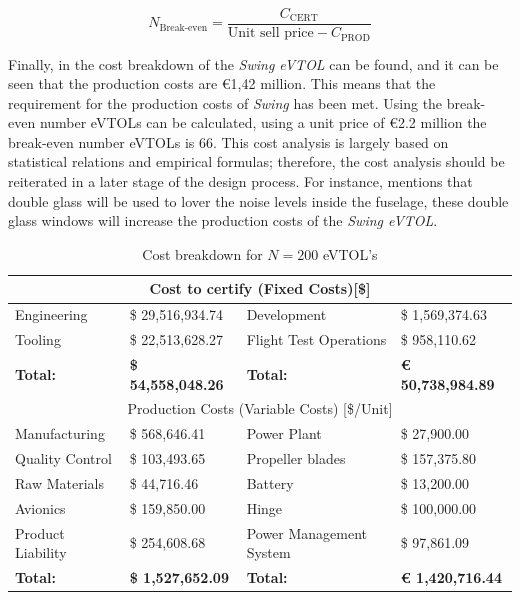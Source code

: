 \begin{equation}
    \label{eq:cost:Nbreakeven}
    N_{\text{Break-even}} = \frac{C_{\text{CERT}}}{\text{Unit sell price} - C_{\text{PROD}} }
\end{equation}

Finally, in  the cost breakdown of the \textit{Swing eVTOL} can be found, and it can be seen that the production costs are €1,42 million.
This means that the requirement for the production costs of \textit{Swing} has been met.
Using  the break-even number eVTOLs can be calculated, using a unit price of €2.2 million the break-even number eVTOLs is 66.
This cost analysis is largely based on statistical relations and empirical formulas; therefore, the cost analysis should be reiterated in a later stage of the design process.
For instance,  mentions that double glass will be used to lover the noise levels inside the fuselage, these double glass windows will increase the production costs of the \textit{Swing eVTOL}.

\begin{table}[h]
\centering
\caption{Cost breakdown for $N = 200$ eVTOL's}
\label{tab:cost_breakdown}
\begin{tabular}{l|l|l|l}
\toprule
\multicolumn{4}{c}{Cost to certify (Fixed Costs){[}\${]}}                                                     \\ \midrule
Engineering     & \$  29,516,934.74       & Development            & \$     1,569,374.63     \\
Tooling         & \$  22,513,628.27       & Flight Test Operations & \$         958,110.62   \\ \midrule
\textbf{Total:} & \textbf{\$  54,558,048.26}   & \textbf{Total:} & \textbf{€  50,738,984.89}   \\ \toprule
\multicolumn{4}{c}{Production Costs (Variable Costs) {[}\$/Unit{]}}                                             \\ \midrule
Manufacturing   & \$         568,646.41   & Power Plant            & \$            27,900.00 \\
Quality Control & \$         103,493.65   & Propeller blades       & \$         157,375.80   \\
Raw Materials   & \$            44,716.46 & Battery                & \$            13,200.00 \\
Avionics        & \$         159,850.00   & Hinge                  & \$         100,000.00   \\
Product Liability         & \$         254,608.68        & Power Management System   & \$            97,861.09     \\ \midrule
\textbf{Total:} & \textbf{\$     1,527,652.09} & \textbf{Total:} & \textbf{€     1,420,716.44} \\ \bottomrule
\end{tabular}
\end{table}


